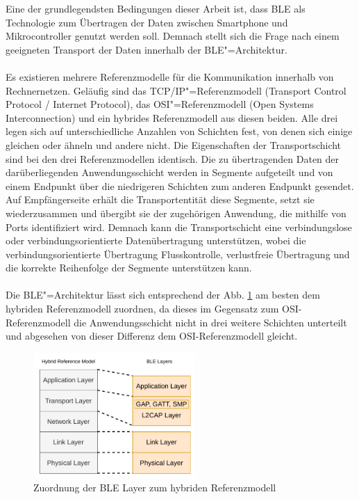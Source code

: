 Eine der grundlegendsten Bedingungen dieser Arbeit ist, dass BLE als Technologie zum Übertragen der Daten zwischen Smartphone und Mikrocontroller genutzt werden soll. Demnach stellt sich die Frage nach einem geeigneten Transport der Daten innerhalb der BLE"=Architektur.
\\\\
Es existieren mehrere Referenzmodelle für die Kommunikation innerhalb von Rechnernetzen. Geläufig sind das TCP/IP"=Referenzmodell (Transport Control Protocol / Internet Protocol), das OSI"=Referenzmodell (Open Systems Interconnection) und ein hybrides Referenzmodell aus diesen beiden. Alle drei legen sich auf unterschiedliche Anzahlen von Schichten fest, von denen sich einige gleichen oder ähneln und andere nicht. Die Eigenschaften der Transportschicht sind bei den drei Referenzmodellen identisch. Die zu übertragenden Daten der darüberliegenden Anwendungsschicht werden in Segmente aufgeteilt und von einem Endpunkt über die niedrigeren Schichten zum anderen Endpunkt gesendet. Auf Empfängerseite erhält die Transportentität diese Segmente, setzt sie wiederzusammen und übergibt sie der zugehörigen Anwendung, die mithilfe von Ports identifiziert wird. Demnach kann die Transportschicht eine verbindungslose oder verbindungsorientierte Datenübertragung unterstützen, wobei die verbindungsorientierte Übertragung Flusskontrolle, verlustfreie Übertragung und die korrekte Reihenfolge der Segmente unterstützen kann. \cite{Baun2019_36-40}
\\\\
Die BLE"=Architektur lässt sich entsprechend der Abb. \ref{fig: hyb referenzmodell ble} am besten dem hybriden Referenzmodell zuordnen, da dieses im Gegensatz zum OSI-Referenzmodell die Anwendungsschicht nicht in drei weitere Schichten unterteilt und abgesehen von dieser Differenz dem OSI-Referenzmodell gleicht.

\begin{figure}[H]
    \centering
    \includegraphics[width=0.55\textwidth]{graphics/hybr_referenzmodell_zu_ble.pdf}
    \caption[Zuordnung der BLE Layer zum hybriden Referenzmodell]{Zuordnung der BLE Layer zum hybriden Referenzmodell}
    \label{fig: hyb referenzmodell ble}
\end{figure}

